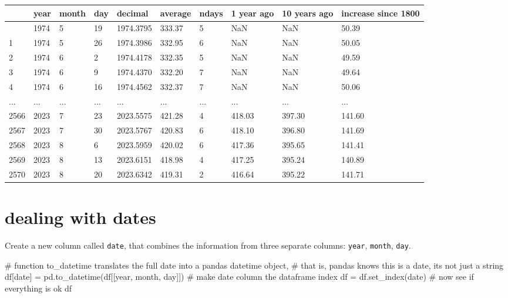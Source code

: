 \documentclass[
  letterpaper,
  DIV=11,
  numbers=noendperiod,
  oneside]{scrreprt}
\newenvironment{Shaded}{\begin{snugshade}}{\end{snugshade}}
\newcommand{\CommentTok}[1]{\textcolor[rgb]{0.37,0.37,0.37}{#1}}
\newcommand{\NormalTok}[1]{\textcolor[rgb]{0.00,0.23,0.31}{#1}}
\newcommand{\OperatorTok}[1]{\textcolor[rgb]{0.37,0.37,0.37}{#1}}
\newcommand{\StringTok}[1]{\textcolor[rgb]{0.13,0.47,0.30}{#1}}
\begin{document}
\begin{longtable}[]{@{}llllllllll@{}}
\toprule\noalign{}
& year & month & day & decimal & average & ndays & 1 year ago & 10 years
ago & increase since 1800 \\
\midrule\noalign{}
\endhead
\bottomrule\noalign{}
\endlastfoot
0 & 1974 & 5 & 19 & 1974.3795 & 333.37 & 5 & NaN & NaN & 50.39 \\
1 & 1974 & 5 & 26 & 1974.3986 & 332.95 & 6 & NaN & NaN & 50.05 \\
2 & 1974 & 6 & 2 & 1974.4178 & 332.35 & 5 & NaN & NaN & 49.59 \\
3 & 1974 & 6 & 9 & 1974.4370 & 332.20 & 7 & NaN & NaN & 49.64 \\
4 & 1974 & 6 & 16 & 1974.4562 & 332.37 & 7 & NaN & NaN & 50.06 \\
... & ... & ... & ... & ... & ... & ... & ... & ... & ... \\
2566 & 2023 & 7 & 23 & 2023.5575 & 421.28 & 4 & 418.03 & 397.30 &
141.60 \\
2567 & 2023 & 7 & 30 & 2023.5767 & 420.83 & 6 & 418.10 & 396.80 &
141.69 \\
2568 & 2023 & 8 & 6 & 2023.5959 & 420.02 & 6 & 417.36 & 395.65 &
141.41 \\
2569 & 2023 & 8 & 13 & 2023.6151 & 418.98 & 4 & 417.25 & 395.24 &
140.89 \\
2570 & 2023 & 8 & 20 & 2023.6342 & 419.31 & 2 & 416.64 & 395.22 &
141.71 \\
\end{longtable}

\hypertarget{dealing-with-dates}{%
\section{dealing with dates}\label{dealing-with-dates}}

Create a new column called \texttt{date}, that combines the information
from three separate columns: \texttt{year}, \texttt{month},
\texttt{day}.

\begin{Shaded}
\begin{Highlighting}[]
\CommentTok{\# function to\_datetime translates the full date into a pandas datetime object,}
\CommentTok{\# that is, pandas knows this is a date, it\textquotesingle{}s not just a string}
\NormalTok{df[}\StringTok{\textquotesingle{}date\textquotesingle{}}\NormalTok{] }\OperatorTok{=}\NormalTok{ pd.to\_datetime(df[[}\StringTok{\textquotesingle{}year\textquotesingle{}}\NormalTok{, }\StringTok{\textquotesingle{}month\textquotesingle{}}\NormalTok{, }\StringTok{\textquotesingle{}day\textquotesingle{}}\NormalTok{]])}
\CommentTok{\# make \textquotesingle{}date\textquotesingle{} column the dataframe index}
\NormalTok{df }\OperatorTok{=}\NormalTok{ df.set\_index(}\StringTok{\textquotesingle{}date\textquotesingle{}}\NormalTok{)}
\CommentTok{\# now see if everything is ok}
\NormalTok{df}
\end{Highlighting}
\end{Shaded}
\end{document}
